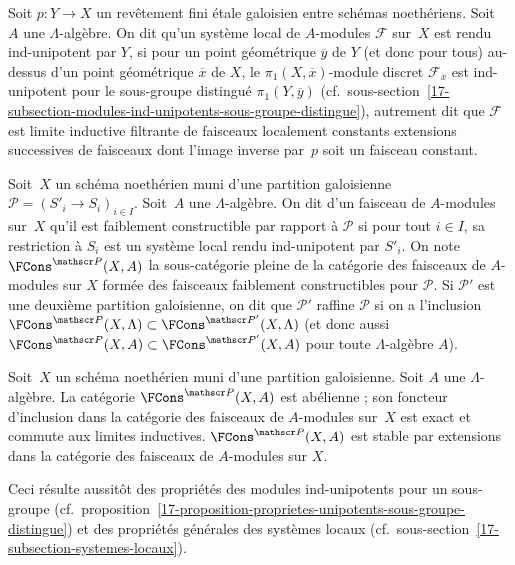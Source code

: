 \documentclass[10pt]{../fichiers-configuration-latex/smfart}
\begin{document}
\begin{definition2}
Soit $p\colon Y\to X$ un revêtement fini étale galoisien entre schémas
noethériens. Soit $A$ une
$\Lambda$-algèbre.
On dit qu'un système local de $A$-modules $\mathscr F$ sur $X$ est 
rendu ind-unipotent par $Y$, si pour un point géométrique $\overline y$ de
$Y$ (et donc pour tous) au-dessus d'un point géométrique $\overline x$ de
$X$, le $\pi_1(X,\overline x)$-module discret ${\mathscr F}_{\overline x}$
est ind-unipotent pour le sous-groupe distingué $\pi_1(Y,\overline y)$
(cf.~sous-section~\ref{17-subsection-modules-ind-unipotents-sous-groupe-distingue}),
autrement dit que $\mathscr F$ est limite inductive filtrante de faisceaux
localement constants extensions successives de faisceaux dont l'image
inverse par $p$ soit un faisceau constant.
\end{definition2}

\begin{definition2}
Soit $X$ un schéma noethérien muni d'une partition galoisienne $\mathscr
P=(S'_i\to S_i)_{i\in I}$. Soit $A$ une $\Lambda$-algèbre.
On dit d'un faisceau de
$A$-modules sur $X$ qu'il est faiblement constructible par rapport à
$\mathscr P$ si pour tout $i\in I$, sa restriction à $S_i$ est un système
local rendu ind-unipotent par $S'_i$. On note $\FCons^{\mathscr P}(X,A)$ la
sous-catégorie pleine de la catégorie des faisceaux de $A$-modules sur $X$
formée des faisceaux faiblement constructibles pour $\mathscr P$.
Si $\mathscr P'$ est une deuxième partition galoisienne, on dit que
$\mathscr P'$ raffine $\mathscr P$ si on a l'inclusion $\FCons^{\mathscr
P}(X,\Lambda)\subset \FCons^{\mathscr P'}(X,\Lambda)$ (et donc aussi
$\FCons^{\mathscr P}(X,A)\subset \FCons^{\mathscr
P'}(X,A)$ pour toute $\Lambda$-algèbre $A$).
\end{definition2}

\begin{proposition2}
Soit $X$ un schéma noethérien muni d'une partition galoisienne. Soit $A$
une $\Lambda$-algèbre.
La catégorie $\FCons^{\mathscr P}(X,A)$ est abélienne ; son foncteur
d'inclusion dans la catégorie des faisceaux de $A$-modules sur $X$ est
exact et commute aux limites inductives. $\FCons^{\mathscr P}(X,A)$ est 
stable par extensions dans la catégorie des faisceaux de $A$-modules
sur $X$.
\end{proposition2}

Ceci résulte aussitôt des propriétés des modules ind-unipotents pour un
sous-groupe
(cf.~proposition~\ref{17-proposition-proprietes-unipotents-sous-groupe-distingue})
et des propriétés générales des systèmes locaux
(cf.~sous-section~\ref{17-subsection-systemes-locaux}).
\end{document}
